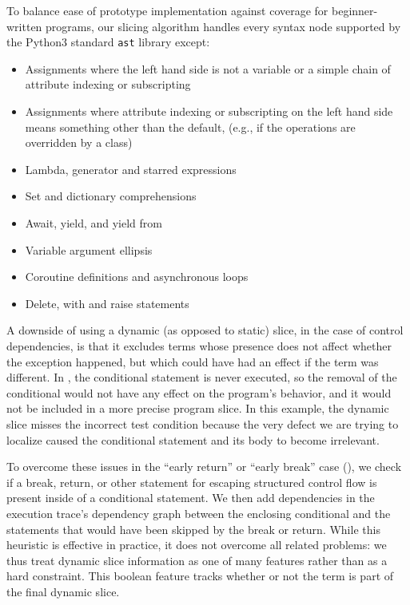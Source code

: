 \documentclass[conference]{IEEEtran}
\newcommand\lt[1]{{\lstinline|#1|}}
\begin{document}
To balance ease of prototype implementation against coverage for
beginner-written programs, our slicing algorithm handles every syntax node
supported by the Python3 standard \lt{ast} library except:
\begin{itemize}
\item Assignments where the left hand side is not a variable or a simple chain
  of attribute indexing or subscripting
\item Assignments where attribute indexing or subscripting on the left hand side
  means something other than the default, (e.g., if the operations are
  overridden by a class)
\item Lambda, generator and starred expressions
\item Set and dictionary comprehensions
\item Await, yield, and yield from
\item Variable argument ellipsis
\item Coroutine definitions and asynchronous loops
\item Delete, with and raise statements
\end{itemize}

A downside of using a dynamic (as opposed to static) slice, in the case of
control dependencies, is that it excludes terms whose presence does not
affect whether the exception happened, but which could have had an effect
if the term was different. In
, the conditional statement is never
executed, so the removal of the conditional would not have any effect on
the program's behavior, and it would not be included in a more precise
program slice. In this example, the dynamic slice misses the incorrect
test condition because the very defect we are trying to localize
caused the conditional statement and its body to become irrelevant.

To overcome these issues in the ``early return'' or ``early break'' case
(), we check if a break, return, or other statement for
escaping structured control flow is present inside of a conditional
statement. We then add dependencies in the execution trace's dependency graph
between the enclosing conditional and the statements that would have been skipped
by the break or return. While this heuristic is effective in practice, it
does not overcome all related problems: we thus treat dynamic slice
information as one of many features rather than as a hard constraint.
This boolean feature tracks whether or not the term is part of the final
dynamic slice.
\end{document}
